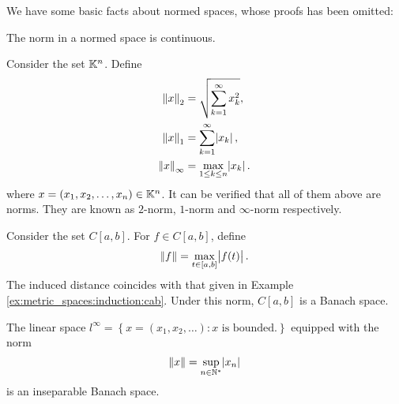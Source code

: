We have some basic facts about normed spaces, whose proofs has been omitted: 
\begin{prop}
The norm in a normed space is continuous.
\end{prop}

\begin{example}
Consider the set $\mathbb{K}^n$. 
Define
\begin{equation*}
    \begin{aligned}
        \norm{x}_2 &= \sqrt{\sum_{k=1}^{\infty} x_k^2},  \\ 
        \norm{x}_1 &= \sum_{k=1}^{\infty} \abs{x_k},  \\
        \norm{x}_\infty &= \max_{1 \le k \le n} \abs{x_k}.
    \end{aligned}
\end{equation*}
where $x = \left( x_1, x_2, \ldots, x_n \right) \in \mathbb{K}^n$. 
It can be verified that all of them above are norms. 
They are known as $2$-norm, $1$-norm and $\infty$-norm respectively. 
\end{example}

\begin{example}
Consider the set $C[a, b]$. 
For $f \in C[a, b]$, define 
\begin{equation*}
    \norm{f} = \max_{t \in [a, b]} \abs{f(t)}. 
\end{equation*}
The induced distance coincides with that given in Example 
\ref{ex:metric_spaces:induction:cab}. 
Under this norm, $C[a, b]$ is a Banach space. 
\end{example}

\begin{example}
The linear space $l^\infty = \left\{ x = \left(x_1, x_2, \ldots \right): 
x \text{ is bounded.} \right\}$ equipped with the norm 
\begin{equation*}
    \norm{x} = \sup_{n \in \mathbb{N}^\ast} \abs{x_n} 
\end{equation*}
is an inseparable Banach space. 
\end{example}

